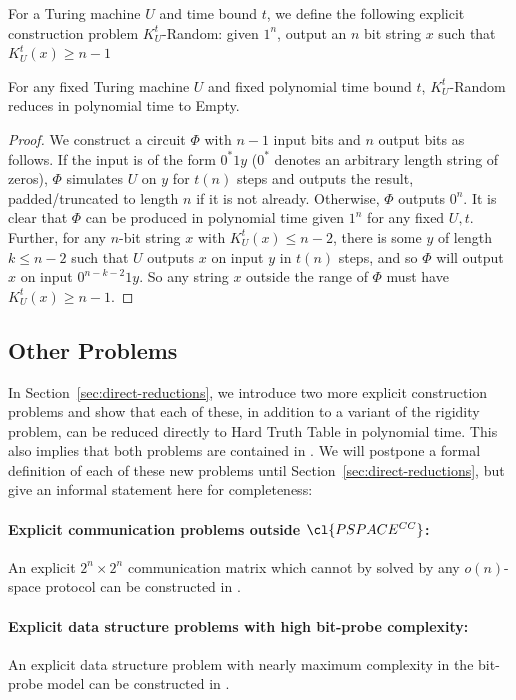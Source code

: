 \begin{definition}
For a Turing machine $U$ and time bound $t$, we define the following explicit construction problem {\sc $K_U^t$-Random}: given $1^n$, output an $n$ bit string $x$ such that $K_U^t(x) \geq n - 1$
\end{definition}

\begin{theorem}\label{thm:kt-random}
For any fixed Turing machine $U$ and fixed polynomial time bound $t$, {\sc $K_U^t$-Random} reduces in polynomial time to {\sc Empty}.
\end{theorem}
\begin{proof}
We construct a circuit $\Phi$ with $n-1$ input bits and $n$ output bits as follows. If the input is of the form $0^*1y$ ($0^*$ denotes an arbitrary length string of zeros), $\Phi$ simulates $U$ on $y$ for $t(n)$ steps and outputs the result, padded/truncated to length $n$ if it is not already. Otherwise, $\Phi$ outputs $0^n$. It is clear that $\Phi$ can be produced in polynomial time given $1^n$ for any fixed $U,t$. Further, for any $n$-bit string $x$ with $K_U^t(x) \leq n - 2$, there is some $y$ of length $k \leq n-2$ such that $U$ outputs $x$ on input $y$ in $t(n)$ steps, and so $\Phi$ will output $x$ on input $0^{n-k-2}1y$. So any string $x$ outside the range of $\Phi$ must have $K_U^t(x) \geq n - 1$.
\end{proof}

\subsection{Other Problems}
In Section~\ref{sec:direct-reductions}, we introduce two more explicit construction problems and show that each of these, in addition to a variant of the rigidity problem, can be reduced directly to {\sc Hard Truth Table} in polynomial time. This also implies that both problems are contained in . We will  postpone a formal definition of each of these new problems until Section~\ref{sec:direct-reductions}, but give an informal statement here for completeness:

\paragraph{Explicit communication problems outside $\cl{PSPACE^{CC}}$:} An explicit $2^n \times 2^n$ communication matrix which cannot by solved by any $o(n)$-space protocol can be constructed in  .

\paragraph{Explicit data structure problems with high bit-probe complexity:} An explicit data structure problem with nearly maximum complexity in the bit-probe model can be constructed in .

